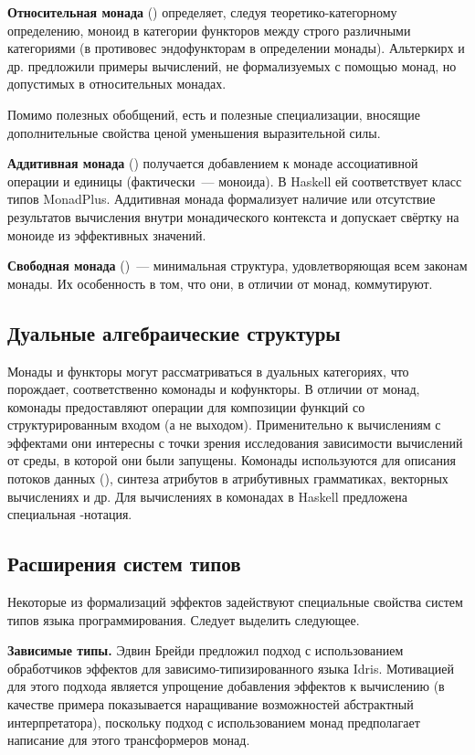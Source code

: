 \textbf{Относительная монада} () определяет, следуя теоретико-категорному определению, моноид в категории функторов между строго различными категориями (в противовес эндофункторам в определении монады). Альтеркирх и др.\cite{Altenkirch2010a,Altenkirch2010} предложили примеры вычислений, не формализуемых с помощью монад, но допустимых в относительных монадах.

Помимо полезных обобщений, есть и полезные специализации, вносящие дополнительные свойства ценой уменьшения выразительной силы.

\textbf{Аддитивная монада} () получается добавлением к монаде ассоциативной операции и единицы (фактически~--- моноида). В Haskell ей соответствует класс типов \<MonadPlus\>\cite{auclair2008monadplus}. Аддитивная монада формализует наличие или отсутствие результатов вычисления внутри монадического контекста и допускает свёртку на моноиде из эффективных значений. 

\textbf{Свободная монада} ()~--- минимальная структура, удовлетворяющая всем законам монады. Их особенность в том, что они, в отличии от монад, коммутируют.

\subsection{Дуальные алгебраические структуры}
Монады и функторы могут рассматриваться в дуальных категориях, что порождает, соответственно комонады\cite{Uustalu2008} и кофункторы. В отличии от монад, комонады предоставляют операции для композиции функций со структурированным входом (а не выходом). Применительно к вычислениям с эффектами они интересны с точки зрения исследования зависимости вычислений от среды, в которой они были запущены\cite{Petricek2013}. Комонады используются для описания потоков данных ()\cite{uustalu2006essence}, синтеза атрибутов в атрибутивных грамматиках\cite{uustalu2007comonadic}, векторных вычислениях и др. Для вычислениях в комонадах в Haskell предложена специальная \<\>-нотация\cite{Orchard2012}.

\subsection{Расширения систем типов}
Некоторые из формализаций эффектов задействуют специальные свойства систем типов языка программирования. Следует выделить следующее.

\textbf{Зависимые типы.} Эдвин Брейди предложил\cite{Brady2013} подход с использованием обработчиков эффектов для зависимо-типизированного языка Idris. Мотивацией для этого подхода является упрощение добавления эффектов к вычислению (в качестве примера показывается наращивание возможностей абстрактный интерпретатора), поскольку подход с использованием монад предполагает написание для этого трансформеров монад.

